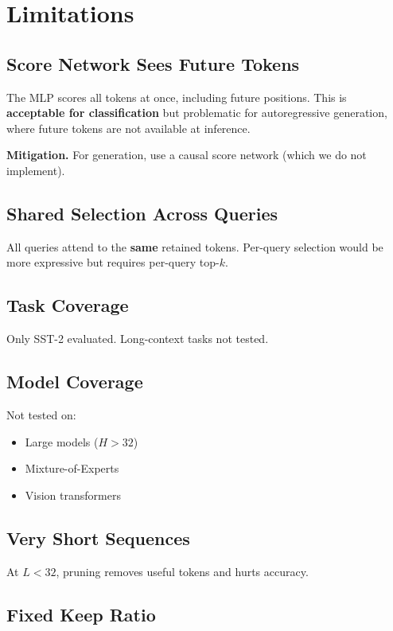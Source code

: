 
\section{Limitations}

\subsection{Score Network Sees Future Tokens}

The MLP scores all tokens at once, including future positions. This is 
\textbf{acceptable for classification} but problematic for autoregressive 
generation, where future tokens are not available at inference.

\textbf{Mitigation.} For generation, use a causal score network (which we do 
not implement).

\subsection{Shared Selection Across Queries}

All queries attend to the \textbf{same} retained tokens. Per-query selection 
would be more expressive but requires per-query top-$k$.

\subsection{Task Coverage}

Only SST-2 evaluated. Long-context tasks not tested.

\subsection{Model Coverage}

Not tested on:
\begin{itemize}
\item Large models ($H > 32$)
\item Mixture-of-Experts
\item Vision transformers

\end{itemize}
\subsection{Very Short Sequences}

At $L < 32$, pruning removes useful tokens and hurts accuracy.

\subsection{Fixed Keep Ratio}


